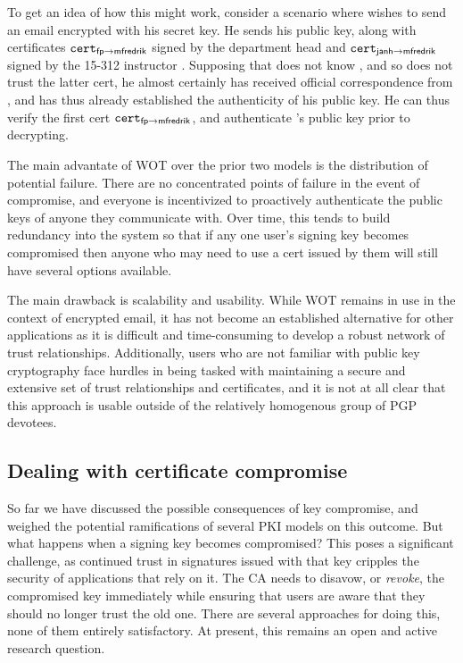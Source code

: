 \documentclass[11pt,twoside]{scrartcl}
\begin{document}
To get an idea of how this might work, consider a scenario where \matt wishes to send \tli an email encrypted with his secret key. He sends his public key, along with certificates $\texttt{\upshape cert}_{\mathsf{fp} \to \mathsf{mfredrik}}$ signed by the department head \frank and $\texttt{\upshape cert}_{\mathsf{janh} \to \mathsf{mfredrik}}$ signed by the 15-312 instructor \jan. Supposing that \tli does not know \jan, and so does not trust the latter cert, he almost certainly has received official correspondence from \frank, and has thus already established the authenticity of his public key. He can thus verify the first cert $\texttt{\upshape cert}_{\mathsf{fp} \to \mathsf{mfredrik}}$, and authenticate \matt's public key prior to decrypting.

The main advantate of WOT over the prior two models is the distribution of potential failure. There are no concentrated points of failure in the event of compromise, and everyone is incentivized to proactively authenticate the public keys of anyone they communicate with. Over time, this tends to build redundancy into the system so that if any one user's signing key becomes compromised then anyone who may need to use a cert issued by them will still have several options available. 

The main drawback is scalability and usability. While WOT remains in use in the context of encrypted email, it has not become an established alternative for other applications as it is difficult and time-consuming to develop a robust network of trust relationships. Additionally, users who are not familiar with public key cryptography face hurdles in being tasked with maintaining a secure and extensive set of trust relationships and certificates, and it is not at all clear that this approach is usable outside of the relatively homogenous group of PGP devotees.

\subsection{Dealing with certificate compromise}

So far we have discussed the possible consequences of key compromise, and weighed the potential ramifications of several PKI models on this outcome. But what happens when a signing key becomes compromised? This poses a significant challenge, as continued trust in signatures issued with that key cripples the security of applications that rely on it. The CA needs to disavow, or \emph{revoke}, the compromised key immediately while ensuring that users are aware that they should no longer trust the old one. There are several approaches for doing this, none of them entirely satisfactory. At present, this remains an open and active research question.
\end{document}
